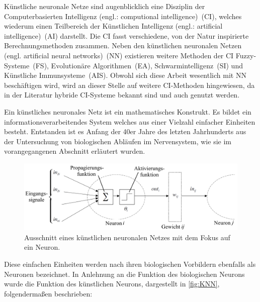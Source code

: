 
Künstliche neuronale Netze sind augenblicklich eine Disziplin der Computerbasierten Intelligenz (engl.: computional intelligence)~(\gls{CI}), welches wiederum einen Teilbereich der Künstlichen Intelligenz (engl.: artificial intelligence)~(\gls{AI}) darstellt. Die CI fasst verschiedene, von der Natur inspirierte Berechnungsmethoden zusammen. Neben den künstlichen neuronalen Netzen (engl. artificial neural networks)~(\gls{NN}) existieren weitere Methoden der CI Fuzzy-Systeme~(\gls{FS}), Evolutionäre Algorithmen~(\gls{EA}), Schwarmintelligenz~(\gls{SI}) und Künstliche Immunsysteme~(\gls{AIS}). Obwohl sich diese Arbeit wesentlich mit NN beschäftigen wird, wird an dieser Stelle auf weitere CI-Methoden hingewiesen, da in der Literatur hybride CI-Systeme bekannt sind und auch genutzt werden.

Ein künstliches neuronales Netz ist ein mathematisches Konstrukt. Es bildet ein informationsverarbeitendes System welches aus einer Vielzahl einfacher Einheiten besteht. Entstanden ist es Anfang der 40er Jahre des letzten Jahrhunderts aus der Untersuchung von biologischen Abläufen im Nervensystem, wie sie im vorangegangenen Abschnitt erläutert wurden. 

\begin{figure}[!htb]
    \centering
        \includegraphics[width=1\textwidth]{Bilder/misc/kuenstliches_neuron.png}
    \caption[Künstliches Neuron (Perceptron)]{Ausschnitt eines künstlichen neuronalen Netzes mit dem Fokus auf ein Neuron.\protect\footnotemark{}}
    \label{fig:KNN}
\end{figure}

\addtocounter{footnote}{-1}     %
\addtocounter{Hfootnote}{-1}    %
\wrapfigfoot{}


Diese einfachen Einheiten werden nach ihren biologischen Vorbildern ebenfalls als Neuronen bezeichnet. In Anlehnung an die Funktion des biologischen Neurons wurde die Funktion des künstlichen Neurons, dargestellt in \autoref{fig:KNN}, folgendermaßen beschrieben:

